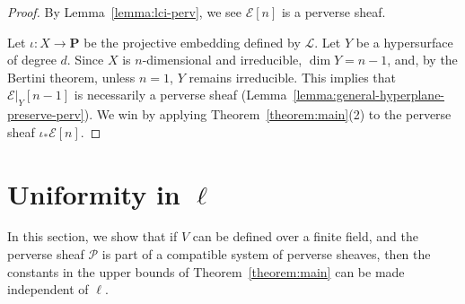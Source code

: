\documentclass[english]{smfart}
\renewcommand{\setminus}{\mathbin{\rule[0.2em]{0.67em}{0.12em}}}%
\renewcommand{\mathbb}{\mathbf}
\renewcommand{\leq}{\leqslant}
\renewcommand{\geq}{\geqslant}
\renewcommand{\subset}{\subseteq}
\theoremstyle{remark}
\theoremstyle{plain}
\theoremstyle{definition}
\numberwithin{equation}{remark}
\theoremstyle{void}
\begin{document}



\begin{proof}
By Lemma~\ref{lemma:lci-perv}, we see \(\mathcal{E}[n]\) is
a perverse sheaf.

Let \(\iota\colon X \to \mathbb{P}\) be the projective embedding
defined by \(\mathscr{L}\).  Let \(Y\) be a hypersurface of degree
\(d\).  Since \(X\) is \(n\)-dimensional and irreducible,
\(\dim Y = n-1\), and, by the Bertini theorem,
unless \(n=1\), \(Y\) remains irreducible.
This implies that \(\mathcal{E}|_{Y}[n-1]\) is necessarily a perverse
sheaf (Lemma~\ref{lemma:general-hyperplane-preserve-perv}).
We win by applying Theorem~\ref{theorem:main}(2) to the
perverse sheaf \(\iota_{\ast}\mathcal{E}[n]\).
\end{proof}

\section{Uniformity in \texorpdfstring{\(\ell\)}{ℓ}}
\label{sec:l-independence}

In this section, we show that if \(V\) can be defined over a finite
field, and the perverse sheaf \(\mathcal{P}\) is part of a compatible
system of perverse sheaves, then the constants in the upper bounds of
Theorem~\ref{theorem:main} can be made independent of \(\ell\).
\end{document}
